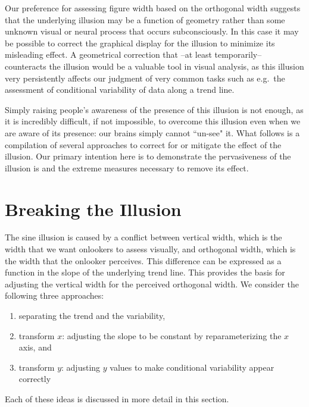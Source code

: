 \documentclass[12pt]{article}\usepackage[]{graphicx}\usepackage[]{color}
\begin{document}
Our preference for assessing figure width based on the orthogonal width suggests that the underlying illusion may be a function of geometry rather than some unknown visual or neural process that occurs subconsciously. In this  case it may be  possible to correct the graphical display for the illusion to minimize its misleading effect. A geometrical correction that  --at least temporarily-- counteracts the illusion would be a valuable tool in visual analysis, as this illusion very persistently affects our judgment of very common tasks  such as e.g.~the assessment of conditional variability of data along a trend line.

Simply raising people's awareness of the presence of this illusion is not enough,
as it is incredibly difficult, if not impossible, to overcome this illusion even when we are aware of its presence: our brains simply cannot ``un-see" it. What follows is a compilation of several approaches to correct for or mitigate the effect of the illusion. Our primary intention here is to demonstrate the pervasiveness of the illusion is and the extreme measures necessary to remove its effect. 

\section{Breaking the Illusion}
The sine  illusion is caused by a conflict between vertical width, which is the width that we want onlookers to assess visually, and orthogonal width, which is the width that the onlooker perceives. This difference can be expressed as a function in the slope of the underlying trend line. This provides the basis for adjusting the vertical width for the perceived orthogonal width. We consider the following three approaches:  
\begin{enumerate}
\item separating the trend and the variability, 
\item transform $x$: adjusting the slope to be constant by reparameterizing the $x$ axis, and
\item transform $y$: adjusting $y$ values to make conditional variability appear correctly
\end{enumerate}
Each of these ideas is discussed in more detail in this section.
\end{document}
